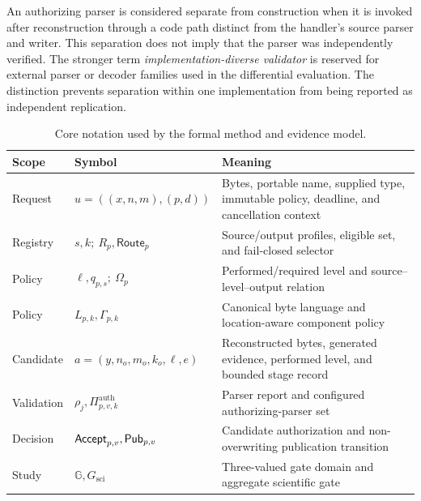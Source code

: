 An authorizing parser is considered separate from construction when it is
invoked after reconstruction through a code path distinct from the handler's
source parser and writer. This separation does not imply that the parser was
independently verified. The stronger term \emph{implementation-diverse
validator} is reserved for external parser or decoder families used in the
differential evaluation. The distinction prevents separation within one
implementation from being reported as independent replication.

\begin{table}[t]
\centering
\caption{Core notation used by the formal method and evidence model.}
\label{tab:core-notation}
\small
\begin{tabularx}{\textwidth}{L{0.16\textwidth}L{0.24\textwidth}Y}
\toprule
Scope & Symbol & Meaning \\
\midrule
Request & \(u=((x,n,m),(p,d))\) & Bytes, portable name, supplied type, immutable policy, deadline, and cancellation context \\
Registry & \(s,k;\ R_p,\mathsf{Route}_p\) & Source/output profiles, eligible set, and fail-closed selector \\
Policy & \(\ell,q_{p,s};\ \Omega_p\) & Performed/required level and source--level--output relation \\
Policy & \(L_{p,k},\Gamma_{p,k}\) & Canonical byte language and location-aware component policy \\
Candidate & \(a=(y,n_o,m_o,k_o,\ell,e)\) & Reconstructed bytes, generated evidence, performed level, and bounded stage record \\
Validation & \(\rho_j,\Pi^{\mathrm{auth}}_{p,v,k}\) & Parser report and configured authorizing-parser set \\
Decision & \(\mathsf{Accept}_{p,v},\mathsf{Pub}_{p,v}\) & Candidate authorization and non-overwriting publication transition \\
Study & \(\mathbb G,G_{\mathrm{sci}}\) & Three-valued gate domain and aggregate scientific gate \\
\bottomrule
\end{tabularx}
\end{table}


